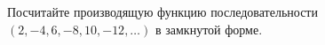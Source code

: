 Посчитайте производящую функцию последовательности $(2, -4, 6, -8, 10, -12, \dots)$ в замкнутой форме.